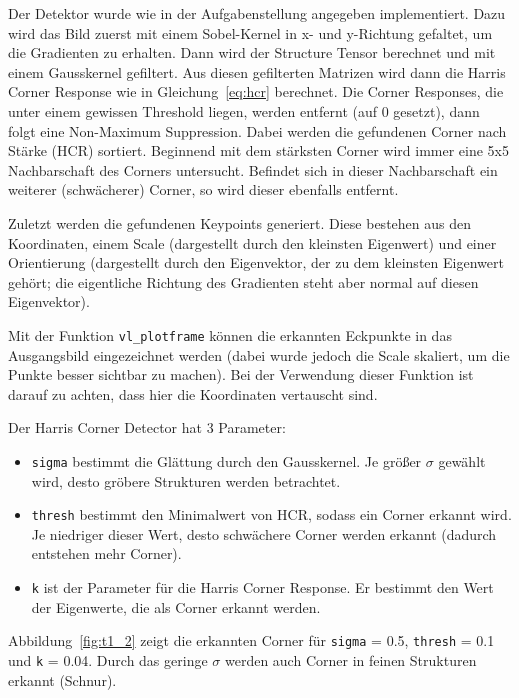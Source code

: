 \smallskip

Der Detektor wurde wie in der Aufgabenstellung angegeben implementiert. Dazu wird das Bild zuerst mit einem Sobel-Kernel in x- und y-Richtung gefaltet, um die Gradienten zu erhalten. Dann wird der Structure Tensor berechnet und mit einem Gausskernel gefiltert. Aus diesen gefilterten Matrizen wird dann die Harris Corner Response wie in Gleichung~\ref{eq:hcr} berechnet. Die Corner Responses, die unter einem gewissen Threshold liegen, werden entfernt (auf 0 gesetzt), dann folgt eine Non-Maximum Suppression. Dabei werden die gefundenen Corner nach Stärke (HCR) sortiert. Beginnend mit dem stärksten Corner wird immer eine 5x5 Nachbarschaft des Corners untersucht. Befindet sich in dieser Nachbarschaft ein weiterer (schwächerer) Corner, so wird dieser ebenfalls entfernt.

Zuletzt werden die gefundenen Keypoints generiert. Diese bestehen aus den Koordinaten, einem Scale (dargestellt durch den kleinsten Eigenwert) und einer Orientierung (dargestellt durch den Eigenvektor, der zu dem kleinsten Eigenwert gehört; die eigentliche Richtung des Gradienten steht aber normal auf diesen Eigenvektor).

Mit der Funktion \texttt{vl\_plotframe} können die erkannten Eckpunkte in das Ausgangsbild eingezeichnet werden (dabei wurde jedoch die Scale skaliert, um die Punkte besser sichtbar zu machen). Bei der Verwendung dieser Funktion ist darauf zu achten, dass hier die Koordinaten vertauscht sind.

Der Harris Corner Detector hat 3 Parameter:

\begin{itemize}
 \item \texttt{sigma} bestimmt die Glättung durch den Gausskernel. Je größer $\sigma$ gewählt wird, desto gröbere Strukturen werden betrachtet.
 \item \texttt{thresh} bestimmt den Minimalwert von HCR, sodass ein Corner erkannt wird. Je niedriger dieser Wert, desto schwächere Corner werden erkannt (dadurch entstehen mehr Corner).
 \item \texttt{k} ist der Parameter für die Harris Corner Response. Er bestimmt den Wert der Eigenwerte, die als Corner erkannt werden.
\end{itemize}

Abbildung~\ref{fig:t1_2} zeigt die erkannten Corner für \texttt{sigma} = 0.5, \texttt{thresh} = 0.1 und \texttt{k} = 0.04. Durch das geringe $\sigma$ werden auch Corner in feinen Strukturen erkannt (Schnur). 

